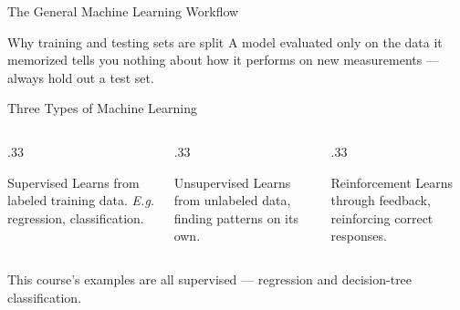 \documentclass[9pt,aspectratio=169,xcolor=table]{beamer}
\begin{document}
\begin{frame}{The General Machine Learning Workflow}
    \leavevmode
    \begin{center}
    \end{center}

    \vspace{3mm}
    \begin{block}{Why training and testing sets are split}
        A model evaluated only on the data it \alert{memorized} tells
        you nothing about how it performs on new measurements --- always
        hold out a test set.
    \end{block}
\end{frame}

\begin{frame}{Three Types of Machine Learning}
    \leavevmode
    \small
    \begin{columns}[t]
        \begin{column}{.33\textwidth}
            \begin{block}{Supervised}
                \scriptsize Learns from \alert{labeled} training data.
                \emph{E.g.} regression, classification.
            \end{block}
        \end{column}
        \begin{column}{.33\textwidth}
            \begin{block}{Unsupervised}
                \scriptsize Learns from \alert{unlabeled} data, finding
                patterns on its own.
            \end{block}
        \end{column}
        \begin{column}{.33\textwidth}
            \begin{block}{Reinforcement}
                \scriptsize Learns through \alert{feedback}, reinforcing
                correct responses.
            \end{block}
        \end{column}
    \end{columns}

    \vspace{3mm}
    {\small This course's examples are all \alert{supervised} ---
    regression and decision-tree classification.}
\end{frame}
\end{document}
